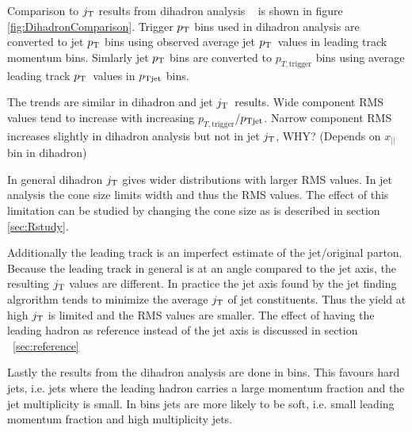 Comparison to $j_{\rm T}$ results from dihadron analysis ~\cite{jussi} is shown in figure \ref{fig:DihadronComparison}. Trigger $p_{\rm T}$ bins used in dihadron analysis are converted to jet $p_{\rm T}$ bins using observed average jet $p_{\rm T}$ values in leading track momentum bins. Simlarly jet $p_{\rm T}$ bins are converted to $p_{T,\mathrm{trigger}}$ bins using average leading track $p_{\rm T}$ values in $p_{\rm Tjet}$ bins.

The trends are similar in dihadron and jet $j_{\rm T}$ results. Wide component RMS values tend to increase with increasing $p_{T,\mathrm{trigger}}$/$p_{\rm Tjet}$. Narrow component RMS increases slightly in dihadron analysis but not in jet $j_{\rm T}$, WHY? (Depends on $x_{||}$ bin in dihadron)

In general dihadron $j_{\rm T}$ gives wider distributions with larger RMS values. In jet analysis the cone size limits width and thus the RMS values. The effect of this limitation can be studied by changing the cone size as is described in section \ref{sec:Rstudy}.

Additionally the leading track is an imperfect estimate of the jet/original parton. Because the leading track in general is at an angle compared to the jet axis, the resulting $j_{\rm T}$ values are different. In practice the jet axis found by the jet finding algrorithm tends to minimize the average $j_{\rm T}$ of jet constituents. Thus the yield at high $j_{\rm T}$ is limited and the RMS values are smaller. The effect of having the leading hadron as reference instead of the jet axis is discussed in section ~\ref{sec:reference}

Lastly the results from the dihadron analysis are done in  bins. This favours hard jets, i.e. jets where the leading hadron carries a large momentum fraction and the jet multiplicity is small. In  bins jets are more likely to be soft, i.e. small leading momentum fraction and high multiplicity jets.



